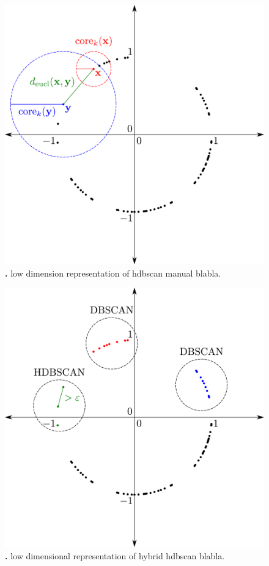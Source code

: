 \begin{figure}[!hbt]
    \centering
    \includegraphics[width=\textwidth]{Graphics/HDB.pdf}
    \caption[]{\textbf{.} low dimension representation of hdbscan manual blabla.}
    \label{fig:HDB}
\end{figure}

\begin{figure}[!hbt]
    \centering
    \includegraphics[width=\textwidth]{Graphics/Hybrid.pdf}
    \caption[]{\textbf{.} low dimensional representation of hybrid hdbscan blabla.}
    \label{fig:Hybrid}
\end{figure}

